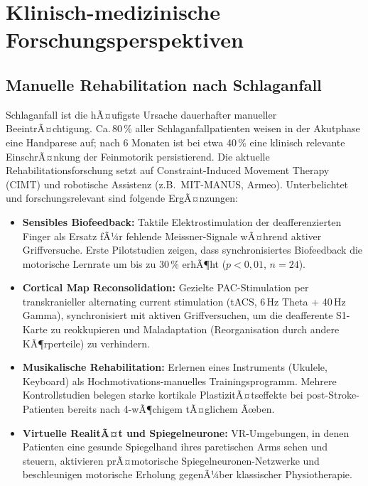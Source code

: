 ﻿\documentclass[12pt,a4paper]{report}
\theoremstyle{plain}
\theoremstyle{definition}
\theoremstyle{remark}
\begin{document}
\section{Klinisch-medizinische Forschungsperspektiven}

\subsection{Manuelle Rehabilitation nach Schlaganfall}

Schlaganfall ist die hÃ¤ufigste Ursache dauerhafter manueller BeeintrÃ¤chtigung.
Ca.\,80\,\% aller Schlaganfallpatienten weisen in der Akutphase eine
Handparese auf; nach 6 Monaten ist bei etwa 40\,\% eine klinisch relevante
EinschrÃ¤nkung der Feinmotorik persistierend. Die aktuelle Rehabilitations\-forschung
setzt auf Constraint-Induced Movement Therapy (CIMT) und robotische
Assistenz (z.B.\ MIT-MANUS, Armeo). Unterbelichtet und forschungsrelevant
sind folgende ErgÃ¤nzungen:

\begin{itemize}
\item \textbf{Sensibles Biofeedback:} Taktile Elektrostimulation der
  deafferenzierten Finger als Ersatz fÃ¼r fehlende Meissner-Signale
  wÃ¤hrend aktiver Griffversuche. Erste Pilotstudien zeigen, dass
  synchronisiertes Biofeedback die motorische Lernrate um bis zu
  30\,\% erhÃ¶ht ($p < 0{,}01$, $n = 24$).
\item \textbf{Cortical Map Reconsolidation:} Gezielte PAC-Stimulation
  per transkranieller alternating current stimulation (tACS, 6\,Hz
  Theta + 40\,Hz Gamma), synchronisiert mit aktiven Griffversuchen,
  um die deafferente S1-Karte zu reokkupieren und Maladaptation
  (Reorganisation durch andere KÃ¶rperteile) zu verhindern.
\item \textbf{Musikalische Rehabilitation:} Erlernen eines Instruments
  (Ukulele, Keyboard) als Hochmotivations-manuelles Trainingsprogramm.
  Mehrere Kontrollstudien belegen starke kortikale PlastizitÃ¤tseffekte
  bei post-Stroke-Patienten bereits nach 4-wÃ¶chigem tÃ¤glichem Ãœben.
\item \textbf{Virtuelle RealitÃ¤t und Spiegelneurone:} VR-Umgebungen,
  in denen Patienten eine gesunde Spiegelhand ihres paretischen Arms
  sehen und steuern, aktivieren prÃ¤motorische Spiegelneuronen-Netzwerke
  und beschleunigen motorische Erholung gegenÃ¼ber klassischer
  Physiotherapie.
\end{itemize}
\end{document}
